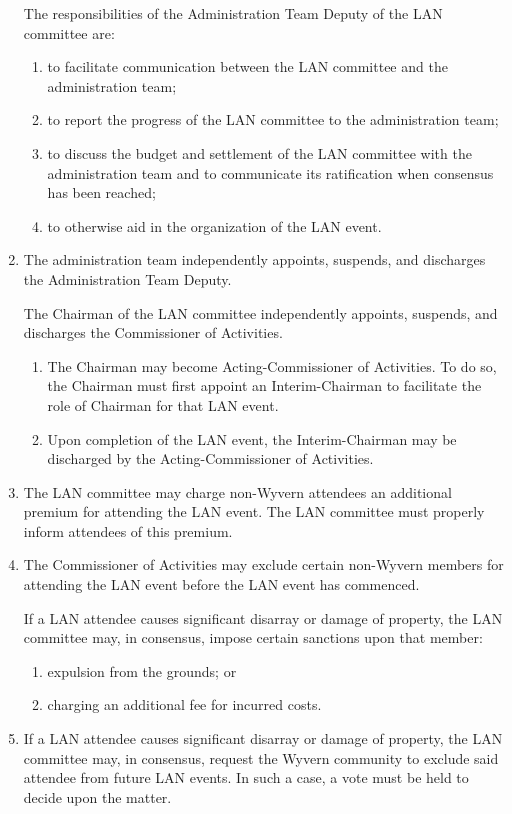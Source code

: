 \begin{enumerate}
    \begin{item}
        The responsibilities of the Administration Team Deputy of the LAN committee are:
        \begin{enumerate}
            \item to facilitate communication between the LAN committee and the administration team;
            \item to report the progress of the LAN committee to the administration team;
            \item to discuss the budget and settlement of the LAN committee with the administration team and to communicate its ratification when consensus has been reached;
            \item to otherwise aid in the organization of the LAN event.
        \end{enumerate}
    \end{item}

    \item The administration team independently appoints, suspends, and discharges the Administration Team Deputy.

    \begin{item}
        The Chairman of the LAN committee independently appoints, suspends, and discharges the Commissioner of Activities.
        \begin{enumerate}
            \item The Chairman may become Acting-Commissioner of Activities. To do so, the Chairman must first appoint an Interim-Chairman to facilitate the role of Chairman for that LAN event.
            \item Upon completion of the LAN event, the Interim-Chairman may be discharged by the Acting-Commissioner of Activities.
        \end{enumerate}
    \end{item}

    \item The LAN committee may charge non-Wyvern attendees an additional premium for attending the LAN event. The LAN committee must properly inform attendees of this premium.
    
    \item The Commissioner of Activities may exclude certain non-Wyvern members for attending the LAN event before the LAN event has commenced.
    
    \begin{item} If a LAN attendee causes significant disarray or damage of property, the LAN committee may, in consensus, impose certain sanctions upon that member:
        \begin{enumerate}
            \item expulsion from the grounds; or
            \item charging an additional fee for incurred costs.
        \end{enumerate}
    \end{item}
    
    \item If a LAN attendee causes significant disarray or damage of property, the LAN committee may, in consensus, request the Wyvern community to exclude said attendee from future LAN events. In such a case, a vote must be held to decide upon the matter.

\end{enumerate}
